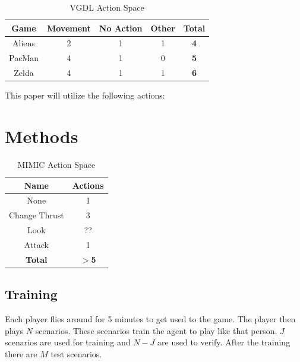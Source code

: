 \documentclass[12pt]{thesis}
\begin{document}
\begin{table}
  \caption{VGDL Action Space}
  \begin{center}
    \begin{tabular}{ | c | c | c | c | c | }
      \hline
      \bf Game & \bf Movement & \bf No Action & \bf Other & \bf Total \\ \hline
      Aliens & 2 & 1 & 1 & \bf 4 \\ \hline
      PacMan & 4 & 1 & 0 & \bf 5 \\ \hline
      Zelda & 4 & 1 & 1 & \bf 6 \\
      \hline
    \end{tabular}
  \end{center}
  \label{tab:vgdl_as}
\end{table}

This paper will utilize the following actions:



\chapter{Methods}
\begin{table}
  \caption{MIMIC Action Space}
  \begin{center}
    \begin{tabular}{ | c | c | }
      \hline
      \bf Name & \bf Actions \\ \hline
      \hline
      None & 1 \\ \hline
      Change Thrust & 3 \\ \hline
      Look & ?? \\ \hline
      Attack & 1 \\ \hline
      \bf Total & \bf $>$5 \\
      \hline
    \end{tabular}
  \end{center}
  \label{tab:mimic_as}
\end{table}

\section{Training}
Each player flies around for 5 minutes to get used to the game. The player then 
plays $N$ %
scenarios. These scenarios train the agent to play like that person. $J$ 
scenarios are used for training and $N - J$ are used to verify. After 
the training there are $M$ %
test scenarios. 
\end{document}
